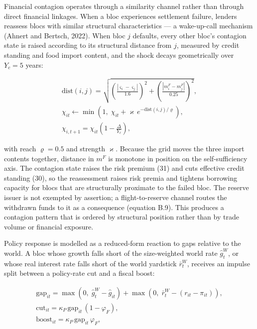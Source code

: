 \documentclass[preprint,review,12pt]{elsarticle}
\begin{document}
Financial contagion operates through a similarity channel rather than
through direct financial linkages. When a bloc experiences settlement
failure, lenders reassess blocs with similar structural characteristics
--- a wake-up-call mechanism (Ahnert and Bertsch, 2022). When bloc \(j\)
defaults, every other bloc's contagion state is raised according to its
structural distance from \(j\), measured by credit standing and food
import content, and the shock decays geometrically over \(Y_c = 5\)
years:

\[\begin{gathered} \mathrm{dist}(i,j) = \sqrt{ \left( \frac{|\varsigma_i - \varsigma_j|}{1.6} \right)^2 + \left( \frac{|m^F_i - m^F_j|}{0.25} \right)^2 }, \\ \chi_{it} \leftarrow \min\left( 1,\; \chi_{it} + \varkappa \, e^{-\mathrm{dist}(i,j)/\varrho} \right), \\ \chi_{i,t+1} = \chi_{it} \left( 1 - \frac{\Delta}{Y_c} \right), \end{gathered} \tag{35}\]

with reach \(\varrho = 0.5\) and strength \(\varkappa\). Because the
grid moves the three import contents together, distance in \(m^F\) is
monotone in position on the self-sufficiency axis. The contagion state
raises the risk premium (31) and cuts effective credit standing (30), so
the reassessment raises risk premia and tightens borrowing capacity for
blocs that are structurally proximate to the failed bloc. The reserve
issuer is not exempted by assertion; a flight-to-reserve channel routes
the withdrawn funds to it as a consequence (equation B.9). This produces
a contagion pattern that is ordered by structural position rather than
by trade volume or financial exposure.

Policy response is modelled as a reduced-form reaction to gaps relative
to the world. A bloc whose growth falls short of the size-weighted world
rate \(\hat{g}^W_t\), or whose real interest rate falls short of the
world yardstick \(\bar{r}^W_t\), receives an impulse split between a
policy-rate cut and a fiscal boost:

\[\begin{gathered} \mathrm{gap}_{it} = \max\left( 0,\; \hat{g}^W_t - \hat{g}_{it} \right) + \max\left( 0,\; \bar{r}^W_t - (r_{it} - \pi_{it}) \right), \\ \mathrm{cut}_{it} = \kappa_P \, \mathrm{gap}_{it} \, (1 - \varphi_F), \\ \mathrm{boost}_{it} = \kappa_P \, \mathrm{gap}_{it} \, \varphi_F, \end{gathered} \tag{36}\]
\end{document}
